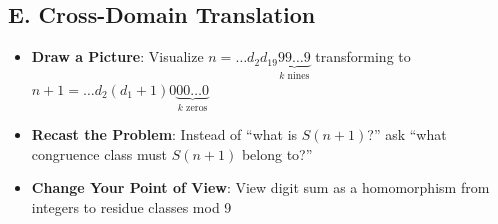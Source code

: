 \documentclass[]{article}
\begin{document}
\begin{strategicbox}
\subsection*{E. Cross-Domain Translation}
\begin{itemize}[leftmargin=*]
    \item \textbf{Draw a Picture}: Visualize $n = \ldots d_2d_19\underbrace{99\ldots9}_{k \text{ nines}}$ transforming to $n+1 = \ldots d_2(d_1+1)0\underbrace{00\ldots0}_{k \text{ zeros}}$
    \item \textbf{Recast the Problem}: Instead of ``what is $S(n+1)$?'' ask ``what congruence class must $S(n+1)$ belong to?''
    \item \textbf{Change Your Point of View}: View digit sum as a homomorphism from integers to residue classes mod 9
\end{itemize}
\end{strategicbox}
\end{document}
